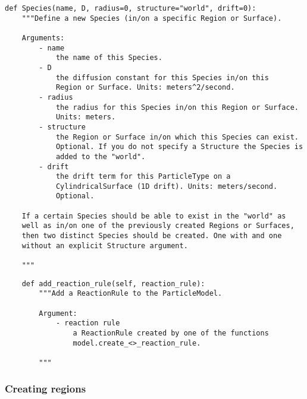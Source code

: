 \documentclass[a4paper,10pt]{article}
\begin{document}
\begin{verbatim}
def Species(name, D, radius=0, structure="world", drift=0):
    """Define a new Species (in/on a specific Region or Surface).

    Arguments:
        - name
            the name of this Species.
        - D
            the diffusion constant for this Species in/on this 
            Region or Surface. Units: meters^2/second.
        - radius
            the radius for this Species in/on this Region or Surface. 
            Units: meters.
        - structure
            the Region or Surface in/on which this Species can exist.  
            Optional. If you do not specify a Structure the Species is 
            added to the "world".
        - drift
            the drift term for this ParticleType on a 
            CylindricalSurface (1D drift). Units: meters/second. 
            Optional.

    If a certain Species should be able to exist in the "world" as 
    well as in/on one of the previously created Regions or Surfaces, 
    then two distinct Species should be created. One with and one 
    without an explicit Structure argument.

    """
\end{verbatim}

\begin{verbatim}
    def add_reaction_rule(self, reaction_rule):
        """Add a ReactionRule to the ParticleModel.

        Argument:
            - reaction rule
                a ReactionRule created by one of the functions
                model.create_<>_reaction_rule.

        """
\end{verbatim}

\subsubsection{Creating regions}
\end{document}
